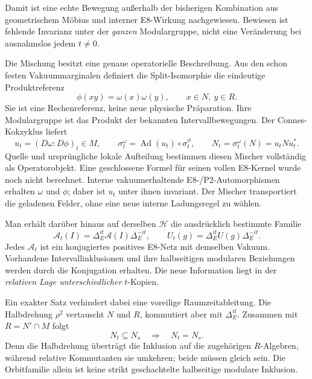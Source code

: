 Damit ist eine echte Bewegung außerhalb der bisherigen Kombination aus geometrischem Möbius und interner E8-Wirkung nachgewiesen. Bewiesen ist fehlende Invarianz unter der \emph{ganzen} Modulargruppe, nicht eine Veränderung bei ausnahmslos jedem $t\ne0$.

Die Mischung besitzt eine genaue operatorielle Beschreibung. Aus den schon festen Vakuummarginalen definiert die Split-Isomorphie die eindeutige Produktreferenz
\begin{equation}
\phi(xy)=\omega(x)\omega(y),\qquad x\in N,\ y\in R.
\end{equation}
Sie ist eine Rechenreferenz, keine neue physische Präparation. Ihre Modulargruppe ist das Produkt der bekannten Intervallbewegungen. Der Connes-Kokzyklus liefert~\cite{connesradon}
\begin{equation}\label{eq:nativecocycle}
u_t=(D\omega:D\phi)_t\in M,\qquad
\sigma_t^\omega=\operatorname{Ad}(u_t)\circ\sigma_t^\phi,\qquad
N_t=\sigma_t^\omega(N)=u_tNu_t^*.
\end{equation}
Quelle und ursprüngliche lokale Aufteilung bestimmen diesen Mischer vollständig als Operatorobjekt. Eine geschlossene Formel für seinen vollen E8-Kernel wurde noch nicht berechnet. Interne vakuumerhaltende E8-/P2-Automorphismen erhalten $\omega$ und $\phi$; daher ist $u_t$ unter ihnen invariant. Der Mischer transportiert die geladenen Felder, ohne eine neue interne Ladungsregel zu wählen.

Man erhält darüber hinaus auf derselben $\mathcal H$ die ausdrücklich bestimmte Familie
\begin{equation}
\mathcal A_t(I)=\Delta_E^{it}\mathcal A(I)\Delta_E^{-it},
\qquad U_t(g)=\Delta_E^{it}U(g)\Delta_E^{-it}.
\end{equation}
Jedes $\mathcal A_t$ ist ein konjugiertes positives E8-Netz mit demselben Vakuum. Vorhandene Intervallinklusionen und ihre halbseitigen modularen Beziehungen werden durch die Konjugation erhalten. Die neue Information liegt in der \emph{relativen Lage unterschiedlicher} $t$-Kopien.

Ein exakter Satz verhindert dabei eine voreilige Raumzeitableitung. Die Halbdrehung $\rho^2$ vertauscht $N$ und $R$, kommutiert aber mit $\Delta_E^{it}$. Zusammen mit $R=N'\cap M$ folgt
\begin{equation}
N_t\subseteq N_s\quad\Longrightarrow\quad N_t=N_s.
\end{equation}
Denn die Halbdrehung überträgt die Inklusion auf die zugehörigen $R$-Algebren, während relative Kommutanten sie umkehren; beide müssen gleich sein. Die Orbitfamilie allein ist keine strikt geschachtelte halbseitige modulare Inklusion.

